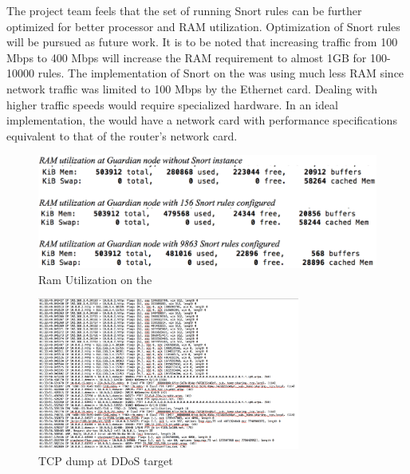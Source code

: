 The project team  feels that the set of running Snort rules can be further optimized for better processor and RAM utilization. Optimization of Snort rules will be pursued as future work. It is to be noted that increasing traffic from 100 Mbps to 400 Mbps will increase the RAM requirement to almost 1GB for 100-10000 rules. The implementation of Snort on the \nodename was using much less RAM since network traffic was limited to 100 Mbps by the Ethernet card. Dealing with higher traffic speeds would require specialized hardware. In an ideal implementation, the \nodename would have a network card with performance specifications equivalent to that of the router's network card.

\begin{figure}
    \centering
    \includegraphics[width=0.95\linewidth]{figs/SnortRam.png}
    \caption{Ram Utilization on the \nodename}
    \label{fig:ramutil}
\end{figure}

 \begin{figure}
    \centering
    \includegraphics[width=0.95\linewidth, height=5cm]{figs/tcpdump.png}
    \caption{TCP dump at DDoS target}
    \label{fig:tcpdump}
\end{figure}